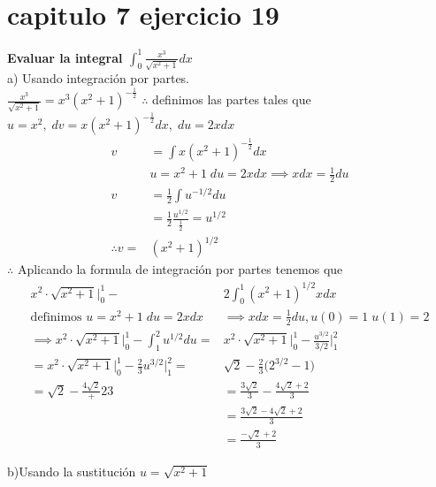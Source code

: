 \chapter*{capitulo 7 ejercicio 19}
\textbf{Evaluar la integral $\displaystyle\int_{0}^{1}\frac{x^3}{\sqrt{x^2+1}}dx$}\\
a) Usando integración por partes.\\
$\displaystyle\frac{x^3}{\sqrt{x^2+1}}=x^3(x^2+1)^{-\frac{1}{2}}$
$\therefore$ definimos las partes tales que
$u=x^2,\;dv=x(x^2+1)^{-\frac{1}{2}}dx,\;du = 2xdx $
\begin{align*}
	v             & =\int x(x^2+1)^{-\frac{1}{2}}dx                 \\
	              & u=x^2+1\; du=2xdx\implies xdx=\frac{1}{2}du     \\
	v             & =\frac{1}{2}\int u^{-1/2}du                     \\
	              & =\frac{1}{2}\frac{u^{1/2}}{\frac{1}{2}}=u^{1/2} \\
	\therefore v= & (x^2+1)^{1/2}
\end{align*}
$\therefore$ Aplicando la formula de integración por partes tenemos que
\begin{align*}
	x^2\cdot \sqrt{x^2 +1}\bigg|^1_0-                                & 2\int_{0}^{1}(x^2 +1)^{1/2}xdx                                 \\
	\text{definimos }u=x^2+1\; du=2xdx                               & \implies xdx=\frac{1}{2}du, u(0)=1\;u(1)=2                     \\
	\implies x^2\cdot \sqrt{x^2 +1}\bigg|^1_0-\int_{1}^{2}u^{1/2}du= & x^2\cdot \sqrt{x^2 +1}\bigg|^1_0-\frac{u^{3/2}}{3/2}\bigg|_1^2 \\
	=x^2\cdot \sqrt{x^2 +1}\bigg|^1_0-\frac{2}{3}u^{3/2}\bigg|_1^2=  & \sqrt{2}-\frac{2}{3}\bigg(2^{3/2}-1\bigg)                      \\
	=\sqrt{2}-\frac{4\sqrt{2}}+2{3}                                  & =\frac{3\sqrt{2}}{3}-\frac{4\sqrt{2}+2}{3}                     \\
	                                                                 & =\frac{3\sqrt{2}-4\sqrt{2}+2}{3}                               \\
	                                                                 & =\frac{-\sqrt{2}+2}{3}
\end{align*}

b)Usando la sustitución $\displaystyle u=\sqrt{x^2+1}$

